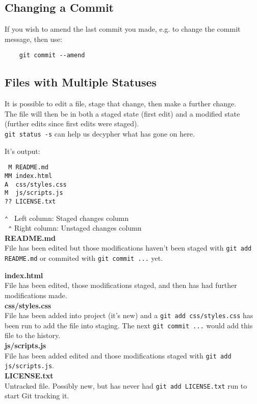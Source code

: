 

\subsection{Changing a Commit}

If you wish to amend the last commit you made, e.g. to change the commit message, then use:

\begin{verbatim}
    git commit --amend
\end{verbatim}


\subsection{Files with Multiple Statuses}

It is possible to edit a file, stage that change, then make a further change.
\\

The file will then be in both a staged state (first edit) and a modified state (further edits since first edits were staged).
\\

\texttt{git status -s} can help us decypher what has gone on here.

It's output:

\begin{verbatim}
 M README.md
MM index.html
A  css/styles.css
M  js/scripts.js
?? LICENSE.txt
\end{verbatim}

\texttt{⌃ } Left column: Staged changes column
\\
\texttt{ ⌃} Right column: Unstaged changes column
\\

\textbf{README.md}
\\
File has been edited but those modifications haven't been staged with \texttt{git add README.md} or commited with \texttt{git commit ...} yet.


\textbf{index.html}
\\
File has been edited, those modifications staged, and then has had further modifications made.
\\

\textbf{css/styles.css}
\\
File has been added into project (it's new) and a \texttt{git add css/styles.css} has been run to add the file into staging. The next \texttt{git commit ...} would add this file to the history.
\\

\textbf{js/scripts.js}
\\
File has been added edited and those modifications staged with \texttt{git add js/scripts.js}.
\\

\textbf{LICENSE.txt}
\\
Untracked file. Possibly new, but has never had \texttt{git add LICENSE.txt} run to start Git tracking it.
\\
